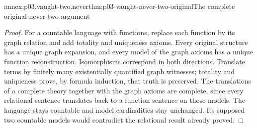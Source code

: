 \begin{annexitem}{annex:p03.vaught-two.never}{thm:p03-vaught-never-two-original}{The complete original never-two argument}
\begin{proof}
For a countable language with functions, replace each function by its graph
relation and add totality and uniqueness axioms. Every original structure
has a unique graph expansion, and every model of the graph axioms has a
unique function reconstruction. Isomorphisms correspond in both directions.
Translate terms by finitely many existentially quantified graph witnesses;
totality and uniqueness prove, by formula induction, that truth is preserved.
The translations of a complete theory together with the graph axioms are
complete, since every relational sentence translates back to a function
sentence on those models. The language stays countable and model cardinalities
stay unchanged. Its supposed two countable models would contradict the
relational result already proved.
\end{proof}
\end{annexitem}

